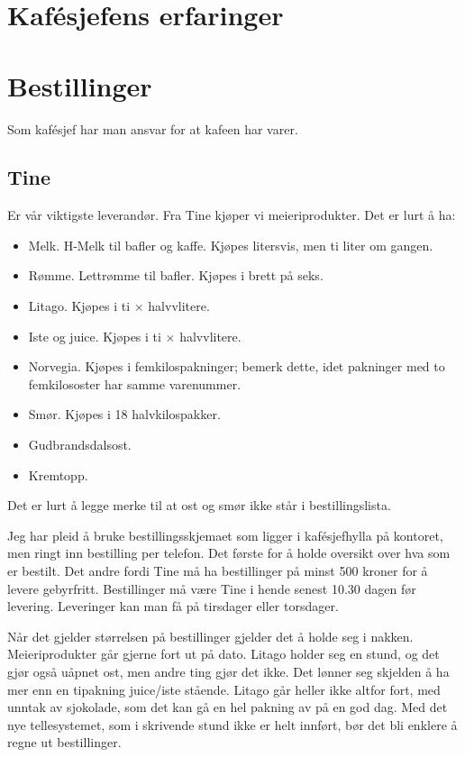 \section{Kaf\'esjefens erfaringer}

\section{Bestillinger}
Som kaf\'esjef har man ansvar for at kafeen har varer.
\subsection{Tine}
Er vår viktigste leverandør. Fra Tine kjøper vi meieriprodukter.
Det er lurt å ha:
\begin{itemize}
	\item Melk. H-Melk til bafler og kaffe. Kjøpes litersvis, 
		men ti liter om gangen.
	\item Rømme. Lettrømme til bafler. Kjøpes i brett på seks.
	\item Litago. Kjøpes i ti $\times$ halvvlitere.
	\item Iste og juice. Kjøpes i ti $\times$ halvvlitere.
	\item Norvegia. Kjøpes i femkilospakninger; bemerk dette, idet
		pakninger med to femkilososter har samme varenummer.
	\item Smør. Kjøpes i 18 halvkilospakker.
	\item Gudbrandsdalsost.
	\item Kremtopp.
\end{itemize}
Det er lurt å legge merke til at ost og smør ikke står i bestillingslista.

Jeg har pleid å bruke bestillingsskjemaet som ligger i kaf\'esjefhylla på kontoret,
men ringt inn bestilling per telefon. Det første for å holde oversikt over hva som
er bestilt. Det andre fordi Tine må ha bestillinger på minst 500 kroner for å
levere gebyrfritt. Bestillinger må være Tine i hende senest 10.30 dagen før levering.
Leveringer kan man få på tirsdager eller torsdager.

Når det gjelder størrelsen på bestillinger gjelder det å holde seg i nakken. 
Meieriprodukter går gjerne fort ut på dato. Litago holder seg en stund, og
det gjør også uåpnet ost, men andre ting gjør det ikke. Det lønner seg skjelden
å ha mer enn en tipakning juice/iste stående. Litago går heller ikke altfor fort,
med unntak av sjokolade, som det kan gå en hel pakning av på en god dag.
Med det nye tellesystemet, som i skrivende stund ikke er helt innført, bør
det bli enklere å regne ut bestillinger.

